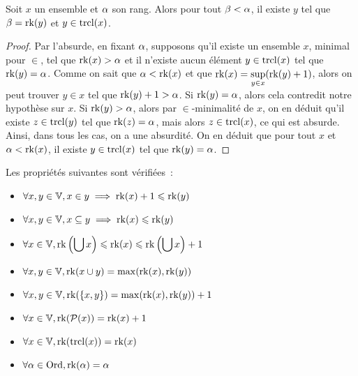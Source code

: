 \begin{lemma}\label{lem.rk.surj}
  Soit $x$ un ensemble et $\alpha$ son rang. Alors pour tout $\beta < \alpha$,
  il existe $y$ tel que $\beta = \operatorname{rk}(y)$ et $y \in \operatorname{trcl}(x)$.
\end{lemma}

\begin{proof}
  Par l'absurde, en fixant $\alpha$, supposons qu'il existe un ensemble $x$,
  minimal pour $\in$, tel que $\operatorname{rk}(x) > \alpha$ et il n'existe aucun élément
  $y\in\operatorname{trcl}(x)$ tel que $\operatorname{rk}(y) = \alpha$. Comme on sait que $\alpha < \operatorname{rk}(x)$
  et que $\displaystyle \operatorname{rk}(x) = \sup_{y \in x} (\operatorname{rk}(y) + 1)$,
  alors on peut trouver $y \in x$ tel que $\operatorname{rk}(y) + 1 > \alpha$. Si
  $\operatorname{rk}(y) = \alpha$, alors cela contredit notre hypothèse sur $x$. Si
  $\operatorname{rk}(y) > \alpha$, alors par $\in$-minimalité de $x$, on en déduit qu'il
  existe $z \in \operatorname{trcl}(y)$ tel que $\operatorname{rk}(z) = \alpha$, mais alors
  $z \in \operatorname{trcl}(x)$, ce qui est absurde. Ainsi, dans tous les cas, on a une
  absurdité. On en déduit que pour tout $x$ et $\alpha < \operatorname{rk}(x)$, il existe
  $y \in \operatorname{trcl}(x)$ tel que $\operatorname{rk}(y) = \alpha$.
\end{proof}

\begin{property}\label{prop.rg.oper}
  Les propriétés suivantes sont vérifiées~:
  \begin{itemize}
  \item $\forall x,y\in\mathbb V, x\in y \implies \operatorname{rk}(x) + 1 \leqslant \operatorname{rk}(y)$
  \item $\forall x,y\in\mathbb V, x\subseteq y \implies \operatorname{rk}(x) \leqslant \operatorname{rk}(y)$
  \item $\displaystyle\forall x\in\mathbb V,\operatorname{rk}\left(\bigcup x\right)\leqslant\operatorname{rk}(x)
    \leqslant \operatorname{rk}\left(\bigcup x\right) + 1$
  \item $\forall x,y\in\mathbb V, \operatorname{rk}(x\cup y) = \max(\operatorname{rk}(x),\operatorname{rk}(y))$
  \item $\forall x,y\in\mathbb V, \operatorname{rk}(\{x,y\}) = \max(\operatorname{rk}(x),\operatorname{rk}(y)) + 1$
  \item $\forall x\in\mathbb V, \operatorname{rk}(\mathcal{P}(x)) = \operatorname{rk}(x) + 1$
  \item $\forall x\in\mathbb V, \operatorname{rk}(\operatorname{trcl}(x)) = \operatorname{rk}(x)$
  \item $\displaystyle \forall \alpha \in \operatorname{Ord}, \operatorname{rk}(\alpha) = \alpha$
  \end{itemize}
\end{property}


